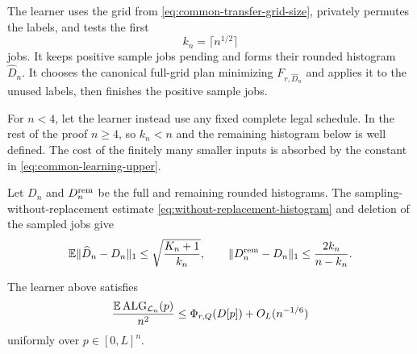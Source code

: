 The learner uses the grid from
\cref{eq:common-transfer-grid-size}, privately permutes the labels, and tests
the first
\begin{equation}
 k_n=\lceil n^{1/2}\rceil
 \label{eq:common-transfer-sample-size}
\end{equation}
jobs.  It keeps positive sample jobs pending and forms their rounded
histogram $\widehat D_n$.  It chooses the canonical full-grid plan minimizing
$F_{r,\widehat D_n}$ and applies it to the unused labels, then finishes the
positive sample jobs.

For $n<4$, let the learner instead use any fixed complete legal schedule.
In the rest of the proof $n\ge4$, so $k_n<n$ and the remaining histogram
below is well defined.  The cost of the finitely many smaller inputs is
absorbed by the constant in \cref{eq:common-learning-upper}.

Let $D_n$ and $D_n^{\rm rem}$ be the full and remaining rounded histograms.
The sampling-without-replacement estimate
\cref{eq:without-replacement-histogram} and deletion of the sampled jobs give
\begin{equation}
 \mathbb{E}\|\widehat D_n-D_n\|_1
 \le\sqrt{\frac{K_n+1}{k_n}},
 \qquad
 \|D_n^{\rm rem}-D_n\|_1
 \le\frac{2k_n}{n-k_n}.
 \label{eq:common-transfer-histogram}
\end{equation}

\begin{claim}
\label{clm:common-learning-upper}
The learner above satisfies
\begin{equation}
 \frac{\mathbb{E}\operatorname{ALG}_{\mathcal L_n}(p)}{n^2}
 \le\Phi_{r,Q}(D[p])+O_L(n^{-1/6})
 \label{eq:common-learning-upper}
\end{equation}
uniformly over $p\in[0,L]^n$.
\end{claim}

